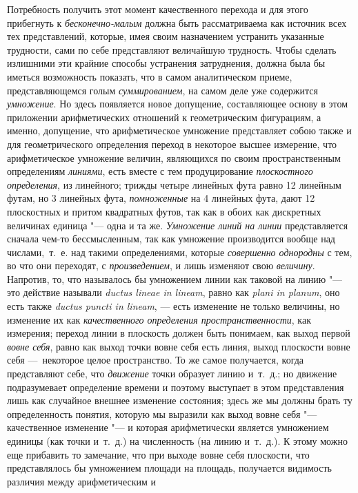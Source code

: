 {Потребность получить этот момент качественного перехода и для этого
прибегнуть к {\em бесконечно-малым} должна быть
рассматриваема как источник всех тех представлений, которые, имея своим
назначением устранить указанные трудности, сами по себе представляют
величайшую трудность. Чтобы сделать излишними эти крайние способы
устранения затруднения, должна была бы иметься возможность показать, что в
самом аналитическом приеме, представляющемся голым
{\em суммированием}, на самом деле уже содержится
{\em умножение}. Но здесь появляется новое допущение,
составляющее основу в этом приложении арифметических отношений к
геометрическим фигурациям, а именно, допущение, что арифметическое
умножение представляет собою также и для геометрического определения
переход в некоторое высшее измерение, что арифметическое умножение величин,
являющихся по своим пространственным определениям
{\em линиями}, есть вместе с тем продуцирование
{\em плоскостного определения}, из линейного; трижды
четыре линейных фута равно 12 линейным футам, но 3 линейных фута,
{\em помноженные} на 4 линейных фута, дают 12
плоскостных и притом квадратных футов, так как в обоих как дискретных
величинах единица "--- одна и та же. {\em Умножение линий
на линии} представляется сначала чем-то бессмысленным, так как умножение
производится вообще над числами,~т.~е. над такими определениями, которые
{\em совершенно однородны} с тем, во что они переходят,
с {\em произведением}, и лишь изменяют свою
{\em величину}. Напротив, то, что называлось бы
умножением линии как таковой на линию "--- это действие называли
{\em ductus lineae in lineam}, равно как
{\em plani in planum}, оно есть также
{\em ductus puncti in lineam}, — есть изменение не
только величины, но изменение их как {\em качественного
определения пространственности}, как измерения; переход линии в плоскость
должен быть понимаем, как выход первой {\em вовне
себя}, равно как выход точки вовне себя есть линия, выход плоскости вовне
себя —~некоторое целое пространство. То же самое получается, когда
представляют себе, что {\em движение} точки образует
линию и~т.~д.; но движение подразумевает определение времени и поэтому
выступает в этом представления лишь как случайное внешнее изменение
состояния; здесь же мы должны брать ту определенность понятия, которую мы
выразили как выход вовне себя "--- качественное изменение "--- и которая
арифметически является умножением единицы (как точки и~т.~д.) на
численность (на линию и~т.~д.). К этому можно еще прибавить то замечание,
что при выходе вовне себя плоскости, что представлялось бы умножением
площади на площадь, получается видимость различия между арифметическим и
}
